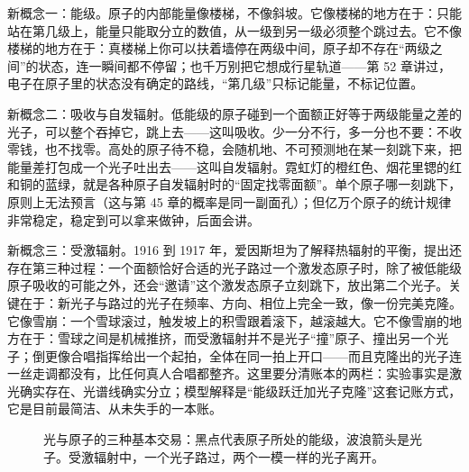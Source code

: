 
\begin{mainline}
新概念一：能级。原子的内部能量像楼梯，不像斜坡。它像楼梯的地方在于：只能站在第几级上，能量只能取分立的数值，从一级到另一级必须整个跳过去。它不像楼梯的地方在于：真楼梯上你可以扶着墙停在两级中间，原子却不存在“两级之间”的状态，连一瞬间都不停留；也千万别把它想成行星轨道——第 52 章讲过，电子在原子里的状态没有确定的路线，“第几级”只标记能量，不标记位置。

新概念二：吸收与自发辐射。低能级的原子碰到一个面额正好等于两级能量之差的光子，可以整个吞掉它，跳上去——这叫吸收。少一分不行，多一分也不要：不收零钱，也不找零。高处的原子待不稳，会随机地、不可预测地在某一刻跳下来，把能量差打包成一个光子吐出去——这叫自发辐射。霓虹灯的橙红色、烟花里锶的红和铜的蓝绿，就是各种原子自发辐射时的“固定找零面额”。单个原子哪一刻跳下，原则上无法预言（这与第 45 章的概率是同一副面孔）；但亿万个原子的统计规律非常稳定，稳定到可以拿来做钟，后面会讲。

新概念三：受激辐射。1916 到 1917 年，爱因斯坦为了解释热辐射的平衡，提出还存在第三种过程：一个面额恰好合适的光子路过一个激发态原子时，除了被低能级原子吸收的可能之外，还会“邀请”这个激发态原子立刻跳下，放出第二个光子。关键在于：新光子与路过的光子在频率、方向、相位上完全一致，像一份完美克隆。它像雪崩：一个雪球滚过，触发坡上的积雪跟着滚下，越滚越大。它不像雪崩的地方在于：雪球之间是机械推挤，而受激辐射并不是光子“撞”原子、撞出另一个光子；倒更像合唱指挥给出一个起拍，全体在同一拍上开口——而且克隆出的光子连一丝走调都没有，比任何真人合唱都整齐。这里要分清账本的两栏：实验事实是激光确实存在、光谱线确实分立；模型解释是“能级跃迁加光子克隆”这套记账方式，它是目前最简洁、从未失手的一本账。
\end{mainline}

\begin{figure}[htbp]
\centering
{}
\caption{光与原子的三种基本交易：黑点代表原子所处的能级，波浪箭头是光子。受激辐射中，一个光子路过，两个一模一样的光子离开。}
\end{figure}

